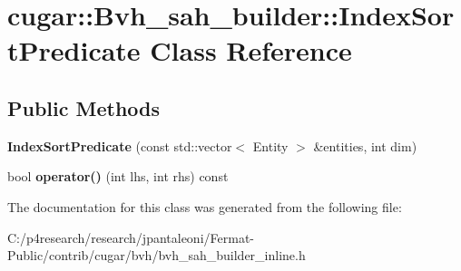 \hypertarget{classcugar_1_1_bvh__sah__builder_1_1_index_sort_predicate}{}\section{cugar\+:\+:Bvh\+\_\+sah\+\_\+builder\+:\+:Index\+Sort\+Predicate Class Reference}
\label{classcugar_1_1_bvh__sah__builder_1_1_index_sort_predicate}
\subsection*{Public Methods}
\begin{DoxyCompactItemize}
\item 
\mbox{\label{classcugar_1_1_bvh__sah__builder_1_1_index_sort_predicate_a4ef01642d5e02f45ab880027e6b2c625}} 
{\bfseries Index\+Sort\+Predicate} (const std\+::vector$<$ Entity $>$ \&entities, int dim)
\item 
\mbox{\label{classcugar_1_1_bvh__sah__builder_1_1_index_sort_predicate_a0642325baf6d8b4adce4c146e3db6fb7}} 
bool {\bfseries operator()} (int lhs, int rhs) const
\end{DoxyCompactItemize}


The documentation for this class was generated from the following file\+:\begin{DoxyCompactItemize}
\item 
C\+:/p4research/research/jpantaleoni/\+Fermat-\/\+Public/contrib/cugar/bvh/bvh\+\_\+sah\+\_\+builder\+\_\+inline.\+h\end{DoxyCompactItemize}
